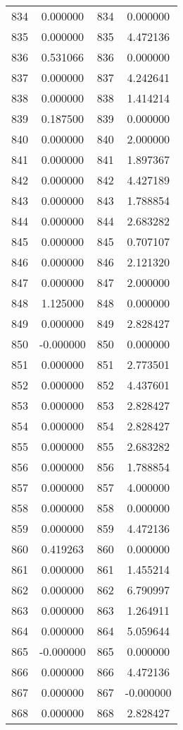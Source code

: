\documentclass[12pt]{article}
\begin{document}
\begin{longtable}{@{}cccc@{}}
834 & 0.000000 & 834 & 0.000000 \\
835 & 0.000000 & 835 & 4.472136 \\
836 & 0.531066 & 836 & 0.000000 \\
837 & 0.000000 & 837 & 4.242641 \\
838 & 0.000000 & 838 & 1.414214 \\
839 & 0.187500 & 839 & 0.000000 \\
840 & 0.000000 & 840 & 2.000000 \\
841 & 0.000000 & 841 & 1.897367 \\
842 & 0.000000 & 842 & 4.427189 \\
843 & 0.000000 & 843 & 1.788854 \\
844 & 0.000000 & 844 & 2.683282 \\
845 & 0.000000 & 845 & 0.707107 \\
846 & 0.000000 & 846 & 2.121320 \\
847 & 0.000000 & 847 & 2.000000 \\
848 & 1.125000 & 848 & 0.000000 \\
849 & 0.000000 & 849 & 2.828427 \\
850 & -0.000000 & 850 & 0.000000 \\
851 & 0.000000 & 851 & 2.773501 \\
852 & 0.000000 & 852 & 4.437601 \\
853 & 0.000000 & 853 & 2.828427 \\
854 & 0.000000 & 854 & 2.828427 \\
855 & 0.000000 & 855 & 2.683282 \\
856 & 0.000000 & 856 & 1.788854 \\
857 & 0.000000 & 857 & 4.000000 \\
858 & 0.000000 & 858 & 0.000000 \\
859 & 0.000000 & 859 & 4.472136 \\
860 & 0.419263 & 860 & 0.000000 \\
861 & 0.000000 & 861 & 1.455214 \\
862 & 0.000000 & 862 & 6.790997 \\
863 & 0.000000 & 863 & 1.264911 \\
864 & 0.000000 & 864 & 5.059644 \\
865 & -0.000000 & 865 & 0.000000 \\
866 & 0.000000 & 866 & 4.472136 \\
867 & 0.000000 & 867 & -0.000000 \\
868 & 0.000000 & 868 & 2.828427 \\

\end{longtable}
\end{document}
